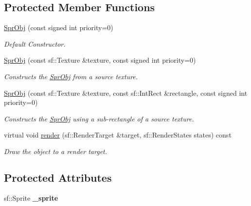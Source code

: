 \subsection*{Protected Member Functions}
\begin{DoxyCompactItemize}
\item 
\hyperlink{class_helios_1_1_spr_obj_a12d178715704be054dbd0534eab42085}{Spr\+Obj} (const signed int priority=0)
\begin{DoxyCompactList}\small\item\em Default Constructor. \end{DoxyCompactList}\item 
\hyperlink{class_helios_1_1_spr_obj_ab74ed9f4a4c3463a578fffc9a83c9fc5}{Spr\+Obj} (const sf\+::\+Texture \&texture, const signed int priority=0)
\begin{DoxyCompactList}\small\item\em Constructs the \hyperlink{class_helios_1_1_spr_obj}{Spr\+Obj} from a source texture. \end{DoxyCompactList}\item 
\hyperlink{class_helios_1_1_spr_obj_ada87975063df60e0804b982a85bff019}{Spr\+Obj} (const sf\+::\+Texture \&texture, const sf\+::\+Int\+Rect \&rectangle, const signed int priority=0)
\begin{DoxyCompactList}\small\item\em Constructs the \hyperlink{class_helios_1_1_spr_obj}{Spr\+Obj} using a sub-\/rectangle of a source texture. \end{DoxyCompactList}\item 
virtual void \hyperlink{class_helios_1_1_spr_obj_a9f21ff22d40d1f06dc58fbc9b2b16de7}{render} (sf\+::\+Render\+Target \&target, sf\+::\+Render\+States states) const 
\begin{DoxyCompactList}\small\item\em Draw the object to a render target. \end{DoxyCompactList}\end{DoxyCompactItemize}
\subsection*{Protected Attributes}
\begin{DoxyCompactItemize}
\item 
\hypertarget{class_helios_1_1_spr_obj_ad7a5db777d590b3835d9b0ec749a5292}{}sf\+::\+Sprite {\bfseries \+\_\+sprite}\label{class_helios_1_1_spr_obj_ad7a5db777d590b3835d9b0ec749a5292}

\end{DoxyCompactItemize}


